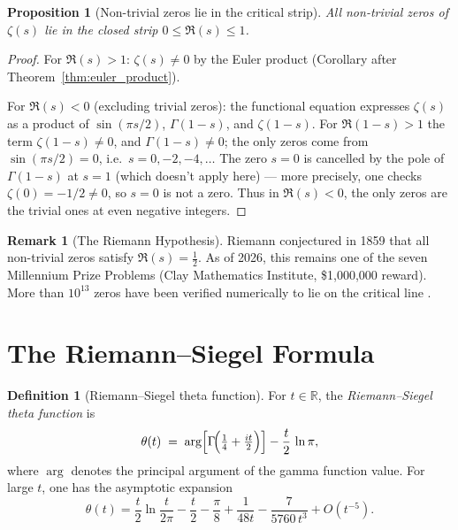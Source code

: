 \documentclass[12pt,a4paper]{amsart}
\newtheorem{proposition}[theorem]{Proposition}
\theoremstyle{definition}
\newtheorem{definition}[theorem]{Definition}
\newtheorem{remark}[theorem]{Remark}
\newcommand{\R}{\mathbb{R}}
\begin{document}
\begin{proposition}[Non-trivial zeros lie in the critical strip]
\label{prop:zeros_in_strip}
All non-trivial zeros of $\zeta(s)$ lie in the closed strip
$0 \le \Re(s) \le 1$.
\end{proposition}

\begin{proof}
For $\Re(s) > 1$: $\zeta(s) \ne 0$ by the Euler product
(Corollary after Theorem~\ref{thm:euler_product}).

For $\Re(s) < 0$ (excluding trivial zeros): the functional equation
expresses $\zeta(s)$ as a product of $\sin(\pi s/2)$, $\Gamma(1-s)$,
and $\zeta(1-s)$.  For $\Re(1-s) > 1$ the term $\zeta(1-s) \ne 0$,
and $\Gamma(1-s) \ne 0$; the only zeros come from $\sin(\pi s/2) = 0$,
i.e.\ $s = 0, -2, -4, \ldots$  The zero $s = 0$ is cancelled by
the pole of $\Gamma(1-s)$ at $s = 1$ (which doesn't apply here) --- more
precisely, one checks $\zeta(0) = -1/2 \ne 0$, so $s=0$ is not a zero.
Thus in $\Re(s) < 0$, the only zeros are the trivial ones at even negative integers.
\end{proof}

\begin{remark}[The Riemann Hypothesis]
\label{rem:rh}
Riemann conjectured in 1859 that all non-trivial zeros satisfy
$\Re(s) = \tfrac{1}{2}$.  As of 2026, this remains one of the seven
Millennium Prize Problems (Clay Mathematics Institute, \$1{,}000{,}000 reward).
More than $10^{13}$ zeros have been verified numerically to lie on the
critical line \cite{Platt2021}.
\end{remark}

\section{The Riemann--Siegel Formula}

\begin{definition}[Riemann--Siegel theta function]
\label{def:theta}
For $t \in \R$, the \emph{Riemann--Siegel theta function} is
\[
  \theta(t) \;=\; \arg\!\left[\Gamma\!\Bigl(\tfrac{1}{4} + \tfrac{it}{2}\Bigr)\right]
  - \frac{t}{2}\,\ln\pi,
\]
where $\arg$ denotes the principal argument of the gamma function value.
For large $t$, one has the asymptotic expansion
\[
  \theta(t) = \frac{t}{2}\ln\frac{t}{2\pi} - \frac{t}{2} - \frac{\pi}{8}
  + \frac{1}{48t} - \frac{7}{5760\,t^3} + O(t^{-5}).
\]
\end{definition}
\end{document}
